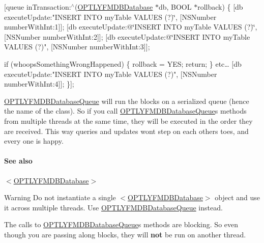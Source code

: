 \mbox{[}queue in\+Transaction\+:$^\wedge$(\mbox{\hyperlink{interface_o_p_t_l_y_f_m_d_b_database}{O\+P\+T\+L\+Y\+F\+M\+D\+B\+Database}} $\ast$db, B\+O\+OL $\ast$rollback) \{ \mbox{[}db execute\+Update\+:"I\+N\+S\+E\+RT I\+N\+TO my\+Table V\+A\+L\+U\+ES (?)\char`\"{}, \mbox{[}\+N\+S\+Number number\+With\+Int\+:1\mbox{]}\mbox{]};
        \mbox{[}db execute\+Update\+:@\char`\"{}I\+N\+S\+E\+RT I\+N\+TO my\+Table V\+A\+L\+U\+ES (?)\char`\"{}, \mbox{[}\+N\+S\+Number number\+With\+Int\+:2\mbox{]}\mbox{]};
        \mbox{[}db execute\+Update\+:@\char`\"{}I\+N\+S\+E\+RT I\+N\+TO my\+Table V\+A\+L\+U\+ES (?)", \mbox{[}N\+S\+Number number\+With\+Int\+:3\mbox{]}\mbox{]};

if (whoops\+Something\+Wrong\+Happened) \{ rollback = Y\+ES; return; \} etc… \mbox{[}db execute\+Update\+:"I\+N\+S\+E\+RT I\+N\+TO my\+Table V\+A\+L\+U\+ES (?)", \mbox{[}N\+S\+Number number\+With\+Int\+:4\mbox{]}\mbox{]}; \}\mbox{]};

{\ttfamily \mbox{\hyperlink{interface_o_p_t_l_y_f_m_d_b_database_queue}{O\+P\+T\+L\+Y\+F\+M\+D\+B\+Database\+Queue}}} will run the blocks on a serialized queue (hence the name of the class). So if you call {\ttfamily \mbox{\hyperlink{interface_o_p_t_l_y_f_m_d_b_database_queue}{O\+P\+T\+L\+Y\+F\+M\+D\+B\+Database\+Queue}}}\textquotesingle{}s methods from multiple threads at the same time, they will be executed in the order they are received. This way queries and updates won\textquotesingle{}t step on each other\textquotesingle{}s toes, and every one is happy.

\paragraph*{See also}


\begin{DoxyItemize}
\item {\ttfamily $<$\mbox{\hyperlink{interface_o_p_t_l_y_f_m_d_b_database}{O\+P\+T\+L\+Y\+F\+M\+D\+B\+Database}}$>$}
\end{DoxyItemize}

\begin{DoxyWarning}{Warning}
Do not instantiate a single {\ttfamily $<$\mbox{\hyperlink{interface_o_p_t_l_y_f_m_d_b_database}{O\+P\+T\+L\+Y\+F\+M\+D\+B\+Database}}$>$} object and use it across multiple threads. Use {\ttfamily \mbox{\hyperlink{interface_o_p_t_l_y_f_m_d_b_database_queue}{O\+P\+T\+L\+Y\+F\+M\+D\+B\+Database\+Queue}}} instead.

The calls to {\ttfamily \mbox{\hyperlink{interface_o_p_t_l_y_f_m_d_b_database_queue}{O\+P\+T\+L\+Y\+F\+M\+D\+B\+Database\+Queue}}}\textquotesingle{}s methods are blocking. So even though you are passing along blocks, they will {\bfseries not} be run on another thread. 
\end{DoxyWarning}


